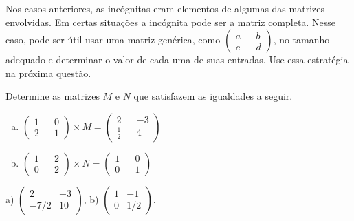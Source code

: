 \documentclass[main.tex]{subfiles}
\begin{document}
Nos casos anteriores, as incógnitas eram elementos de algumas das matrizes envolvidas. Em certas situações a incógnita pode ser a matriz completa. Nesse caso, pode ser útil usar uma matriz genérica, como $\begin{pmatrix} a && b \\ c && d \end{pmatrix}$, no tamanho adequado e determinar o valor de cada uma de suas entradas. Use essa estratégia na próxima questão.

\begin{questao}
Determine as matrizes $M$ e $N$ que satisfazem as igualdades a seguir.
\begin{enumerate}[a)]
\item $ \begin{pmatrix} 1 && 0 \\ 2 && 1 \end{pmatrix} \times M = \begin{pmatrix} 2 && -3 \\ \frac{1}{2} && 4 \end{pmatrix} $
\item $ \begin{pmatrix} 1 && 2 \\ 0 && 2 \end{pmatrix} \times N = \begin{pmatrix} 1 && 0 \\ 0 && 1 \end{pmatrix} $ 
\end{enumerate}
\end{questao}

\begin{gabarito}
	\begin{gabaritoQuestao}
		a) $\begin{pmatrix} 2 & -3 \\ -7/2 & 10\end{pmatrix}$, b) $\begin{pmatrix} 1 & -1 \\ 0 & 1/2\end{pmatrix}$.
	\end{gabaritoQuestao}
\end{gabarito}
\end{document}
